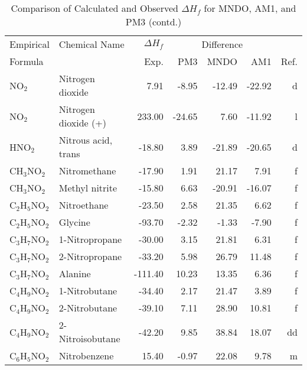 \begin{table}
\caption{Comparison of Calculated and Observed $\Delta H_f$ 
for MNDO, AM1, and PM3 (contd.)}
\begin{center}
\compresstable
\begin{tabular}{llrrrrr}
Empirical & Chemical Name & $\Delta H_f$ & \multicolumn{3}{c}{Difference} & \\
Formula   &               & Exp. & PM3 &  MNDO  &  AM1 &     Ref.\\
\hline
 NO$_2$         & Nitrogen dioxide                &     7.91    &    -8.95  &   -12.49  &   -22.92  &      d\\
 NO$_2$         & Nitrogen dioxide (+)            &   233.00    &   -24.65  &     7.60  &   -11.92  &      l\\
 HNO$_2$        & Nitrous acid, trans             &   -18.80    &     3.89  &   -21.89  &   -20.65  &      d\\
 CH$_3$NO$_2$      & Nitromethane                    &   -17.90    &     1.91  &    21.17  &     7.91  &      f\\
 CH$_3$NO$_2$      & Methyl nitrite                  &   -15.80    &     6.63  &   -20.91  &   -16.07  &      f\\
 C$_2$H$_5$NO$_2$     & Nitroethane                     &   -23.50    &     2.58  &    21.35  &     6.62  &      f\\
 C$_2$H$_5$NO$_2$     & Glycine                         &   -93.70    &    -2.32  &    -1.33  &    -7.90  &      f\\
 C$_3$H$_7$NO$_2$     & 1-Nitropropane                  &   -30.00    &     3.15  &    21.81  &     6.31  &      f\\
 C$_3$H$_7$NO$_2$     & 2-Nitropropane                  &   -33.20    &     5.98  &    26.79  &    11.48  &      f\\
 C$_3$H$_7$NO$_2$     & Alanine                         &  -111.40    &    10.23  &    13.35  &     6.36  &      f\\
 C$_4$H$_9$NO$_2$     & 1-Nitrobutane                   &   -34.40    &     2.17  &    21.47  &     3.89  &      f\\
 C$_4$H$_9$NO$_2$     & 2-Nitrobutane                   &   -39.10    &     7.11  &    28.90  &    10.81  &      f\\
 C$_4$H$_9$NO$_2$     & 2-Nitroisobutane                &   -42.20    &     9.85  &    38.84  &    18.07  &     dd\\
 C$_6$H$_5$NO$_2$     & Nitrobenzene                    &    15.40    &    -0.97  &    22.08  &     9.78  &      m\\

\end{tabular}
\end{center}
\end{table}
